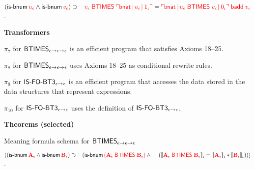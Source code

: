 \begin{biformthy}
    \item $(\mbox{\sf is-bnum} \, \textcolor{red}{u_\epsilon} \wedge 
        \mbox{\sf is-bnum} \, \textcolor{red}{v_\epsilon}) \supset {}\\
        \hspace*{2ex} \textcolor{red}{\textcolor{red}{v_\epsilon} \; \mbox{\sf BTIMES} \;
          \ulcorner\mbox{\sf bnat} \, \lfloor u_\epsilon\rfloor \, 1_\iota\urcorner} =
        \textcolor{red}{\ulcorner\mbox{\sf bnat} \, \lfloor u_\epsilon \;
              \mbox{\sf BTIMES} \; v_\epsilon\rfloor \, 0_\iota\urcorner \; \mbox{\sf badd} \;
          v_\epsilon}$.


  \ee

  \item[] \textbf{Transformers}

  \be

      \setcounter{enumi}{6}

    \item $\pi_7$ for $\mbox{\sf BTIMES}_{\epsilon \rightarrow \epsilon
      \rightarrow \epsilon}$ is an efficient program that satisfies Axioms
      18--25.

    \item $\pi_8$ for $\mbox{\sf BTIMES}_{\epsilon \rightarrow \epsilon
      \rightarrow \epsilon}$ uses Axioms 18--25 as conditional rewrite
      rules.

    \item $\pi_9$ for $\mbox{\sf IS-FO-BT3}_{\epsilon \rightarrow \epsilon}$
      is an efficient program that accesses the data stored in the
      data structures that represent expressions.

    \item $\pi_{10}$ for $\mbox{\sf IS-FO-BT3}_{\epsilon \rightarrow
      \epsilon}$ uses the definition of $\mbox{\sf IS-FO-BT3}_{\epsilon
      \rightarrow \epsilon}$.

  \ee

  \item[] \textbf{Theorems (selected)}

  \be

    \setcounter{enumi}{1}

    \item Meaning formula schema for
    $\mbox{\sf BTIMES}_{\epsilon \rightarrow \epsilon \rightarrow \epsilon}$

    $((\mbox{\sf is-bnum} \, \textcolor{red}{\textbf{A}_\epsilon} \wedge 
      \mbox{\sf is-bnum} \, \textcolor{red}{\textbf{B}_\epsilon}) 
      \supset {}\\
      \hspace*{2ex}(\mbox{\sf is-bnum} \, 
      \textcolor{red}{(\textbf{A}_\epsilon \; \mbox{\sf BTIMES} \; \textbf{B}_\epsilon)} \wedge {}\\
      \hspace*{2.8ex}(\llbracket\textcolor{red}{\textbf{A}_\epsilon \; \mbox{\sf BTIMES} \; 
      \textbf{B}_\epsilon}\rrbracket_\iota = 
      \llbracket\textcolor{red}{\textbf{A}_\epsilon}\rrbracket_\iota * 
      \llbracket\textcolor{red}{\textbf{B}_\epsilon}\rrbracket_\iota)))$.

  \ee

\ei
\end{biformthy}

